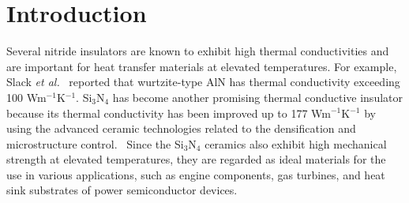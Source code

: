 \documentclass[twocolumn,amsmath,amssymb,a4paper,prb,superscriptaddress,floatfix]{revtex4-1}
\begin{document}
\section{Introduction}
Several nitride insulators are known to exhibit high thermal conductivities and
are important for heat transfer materials at elevated temperatures. For example,
Slack {\it et al.}~\cite{slack} reported that wurtzite-type AlN has thermal
conductivity exceeding 100 Wm$^{-1}$K$^{-1}$. Si$_3$N$_4$ has become another
promising thermal conductive insulator because its thermal conductivity has been
improved up to 177 Wm$^{-1}$K$^{-1}$ by using the advanced ceramic technologies
related to the densification and microstructure
control.~\cite{zhou,hirao-rev,watari,hirosaki} Since the Si$_3$N$_4$ ceramics
also exhibit high mechanical strength at elevated temperatures, they are
regarded as ideal materials for the use in various applications, such as engine
components, gas turbines, and heat sink substrates of power semiconductor
devices.
\end{document}
